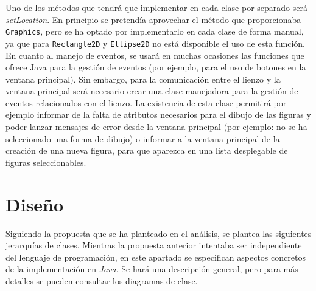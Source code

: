 \vskip0.3cm
Uno de los métodos que tendrá que implementar en cada clase por separado será \textit{setLocation}. En principio se pretendía aprovechar el método que proporcionaba \texttt{Graphics}, pero se ha optado por implementarlo en cada clase de forma manual, ya que para \texttt{Rectangle2D} y \texttt{Ellipse2D} no está disponible el uso de esta función.
\vskip0.3cm
En cuanto al manejo de eventos, se usará en muchas ocasiones las funciones que ofrece Java para la gestión de eventos (por ejemplo, para el uso de botones en la ventana principal). Sin embargo, para la comunicación entre el lienzo y la ventana principal será necesario crear una clase manejadora para la gestión de eventos relacionados con el lienzo. La existencia de esta clase permitirá por ejemplo informar de la falta de atributos necesarios para el dibujo de las figuras y poder lanzar mensajes de error desde la ventana principal (por ejemplo: no se ha seleccionado una forma de dibujo) o informar a la ventana principal de la creación de una nueva figura, para que aparezca en una lista desplegable de figuras seleccionables. 
\clearpage
\section{Diseño}
Siguiendo la propuesta que se ha planteado en el análisis, se plantea las siguientes jerarquías de clases. Mientras la propuesta anterior intentaba ser independiente del lenguaje de programación, en este apartado se especifican aspectos concretos de la implementación en \textit{Java}.
\vskip0.3cm
Se hará una descripción general, pero para más detalles se pueden consultar los diagramas de clase.
